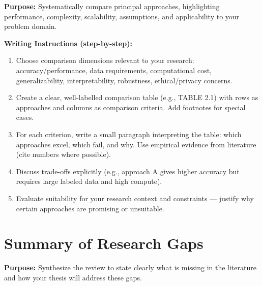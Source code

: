 {\color{blue}\textbf{Purpose:}
Systematically compare principal approaches, highlighting performance, complexity, scalability, assumptions, and applicability to your problem domain.} \\

{\color{red}\textbf{Writing Instructions (step-by-step):}
\begin{enumerate}
    \item Choose comparison dimensions relevant to your research: accuracy/performance, data requirements, computational cost, generalizability, interpretability, robustness, ethical/privacy concerns.
    
    \item Create a clear, well-labelled comparison table (e.g., TABLE 2.1) with rows as approaches and columns as comparison criteria. Add footnotes for special cases.
    
    \item For each criterion, write a small paragraph interpreting the table: which approaches excel, which fail, and why. Use empirical evidence from literature (cite numbers where possible).
    
    \item Discuss trade-offs explicitly (e.g., approach A gives higher accuracy but requires large labeled data and high compute).
    
    \item Evaluate suitability for your research context and constraints — justify why certain approaches are promising or unsuitable.
\end{enumerate}}


\section{Summary of Research Gaps}

{\color{blue}\textbf{Purpose:}
Synthesize the review to state clearly what is missing in the literature and how your thesis will address these gaps.} \\

